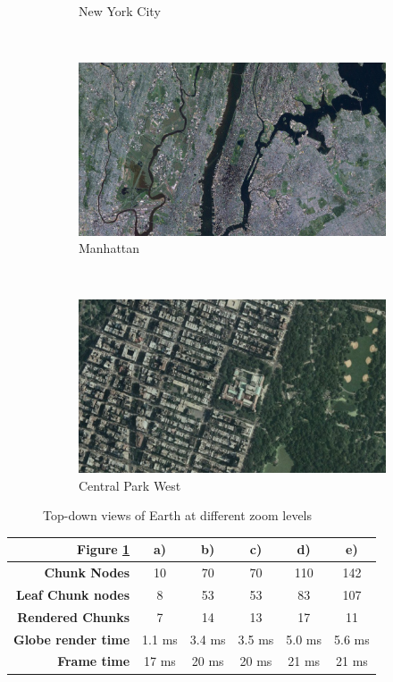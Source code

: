 \begin{figure}[h]
\begin{subfigure}[bt]{0.31\textwidth}
        \caption{New York City}
    \end{subfigure}
    ~
    \begin{subfigure}[bt]{0.31\textwidth}
        \includegraphics[width=\textwidth]{figures/results/topdown/topdown2.png}
        \caption{Manhattan}
    \end{subfigure}
    ~
    \begin{subfigure}[bt]{0.31\textwidth}
        \includegraphics[width=\textwidth]{figures/results/topdown/topdown1.png}
        \caption{Central Park West}
    \end{subfigure}
    \caption{Top-down views of Earth at different zoom levels}
    \label{fig:topdown}
\end{figure}
\begin{table}[h]
\centering
  \label{table:settingstopdown}
  \begin{tabular}{| r | c c c c c |}
    \hline
      \textbf{Figure \ref{fig:topdown}}  & \textbf{a)} & \textbf{b)} & \textbf{c)} & \textbf{d)}  & \textbf{e)}  \\ \hline
      \textbf{Chunk Nodes}          & 10      & 70      & 70      & 110     & 142   \\ 
      \textbf{Leaf Chunk nodes}     & 8       & 53      & 53      & 83      & 107   \\ 
      \textbf{Rendered Chunks}      & 7       & 14      & 13      & 17      & 11   \\
      \textbf{Globe render time}    & 1.1 ms  & 3.4 ms  & 3.5 ms  & 5.0 ms  & 5.6 ms   \\
      \textbf{Frame time}           & 17 ms   & 20 ms   & 20 ms   & 21 ms   & 21 ms  \\
    \hline
  \end{tabular}
\end{table}
